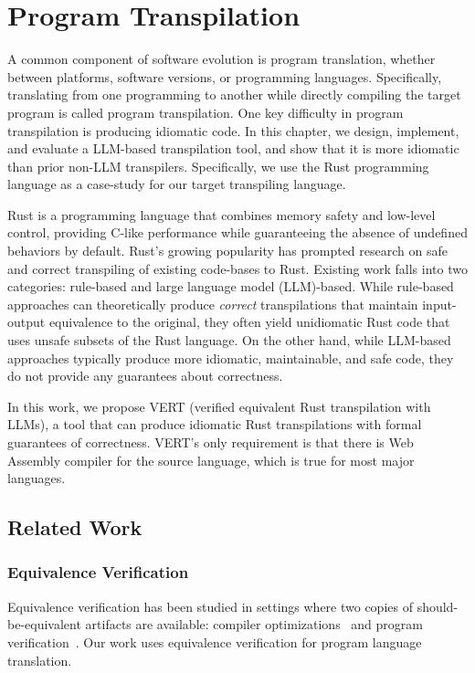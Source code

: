 \documentclass[12pt,openany,oneside,table]{cmuthesis}
\begin{document}
\chapter{Program Transpilation}
\label{ch:vert}
A common component of software evolution is program translation, whether between platforms, software versions, or programming languages. Specifically, translating from one programming to another while directly compiling the target program is called program transpilation.
One key difficulty in program transpilation is producing idiomatic code.
In this chapter, we design, implement, and evaluate a LLM-based transpilation tool, and show that it is more idiomatic than prior non-LLM transpilers. Specifically, we use the Rust programming language as a case-study for our target transpiling language.

Rust is a programming language that combines memory safety and
low-level control, providing C-like performance while guaranteeing the absence of undefined behaviors by default. Rust's growing popularity has prompted research on safe and correct transpiling of existing code-bases to Rust. Existing work falls into two categories: rule-based and large
language model (LLM)-based. While rule-based approaches can
theoretically produce \textit{correct} transpilations that maintain input-output equivalence to the original, they often yield
unidiomatic Rust code that uses unsafe subsets of
the Rust language. On the other hand, while LLM-based approaches typically produce more idiomatic, maintainable, and safe code, they do not provide any guarantees about correctness.

In this work, we propose VERT (verified equivalent Rust transpilation with LLMs), a tool that can produce idiomatic Rust transpilations with formal guarantees of correctness. VERT's only requirement is that there is Web
Assembly compiler for the source language, which is true for most major languages. 

\section{Related Work}

\subsection{Equivalence Verification}

Equivalence verification has been studied in settings where two copies of should-be-equivalent artifacts are available: compiler optimizations~\cite{churchill_semantic_2019,churchill_sound_2017} and program verification~\cite{antonopoulos_algebra_2023,kommrusch_self-supervised_2023}. Our work uses equivalence verification for program language translation.
\end{document}
